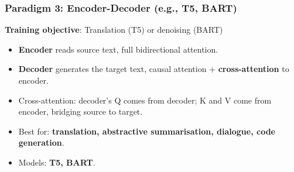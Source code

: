 \begin{frame}[fragile]\frametitle{Paradigm 3: Encoder-Decoder (e.g., T5, BART)}
    \textbf{Training objective}: Translation (T5) or denoising (BART)
    \begin{itemize}
    \item \textbf{Encoder} reads source text,  full bidirectional attention.
    \item \textbf{Decoder} generates the target text,  causal attention + \textbf{cross-attention} to encoder.
    \item Cross-attention: decoder's Q comes from decoder; K and V come from encoder,  bridging source to target.
    \end{itemize}
    \vspace{0.2em}
    \begin{itemize}
    \item Best for: \textbf{translation, abstractive summarisation, dialogue, code generation}.
    \item Models: \textbf{T5, BART}.
    \end{itemize}
\end{frame}

